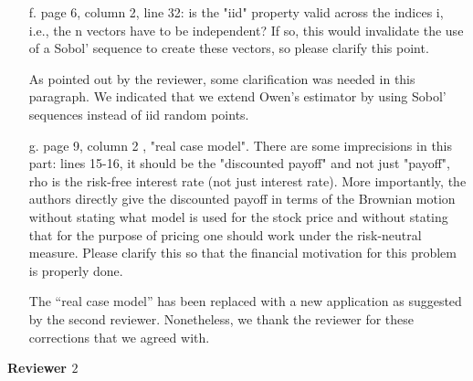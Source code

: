\documentclass[10pt,a4paper]{article}
\newcommand{\answer}[1]{{\color{blue} #1 }}
\begin{document}
\begin{itemize}
\item[f.] page 6, column 2, line 32: is the "iid" property valid across the indices i, i.e., the n vectors have to be independent? If so, this would invalidate the use of a Sobol' sequence to create these vectors, so please clarify this point.

\answer{As pointed out by the reviewer, some clarification was needed in this paragraph. We indicated that we extend  Owen's estimator by using Sobol' sequences instead of iid random points.}

\item[g.] page 9, column 2 , "real case model". There are some imprecisions in this part: lines 15-16, it should be the "discounted payoff" and not just "payoff", rho is the risk-free interest rate (not just interest rate). More importantly, the authors directly give the discounted payoff in terms of the Brownian motion without stating what model is used for the stock price and without stating that for the purpose of pricing one should work under the risk-neutral measure. Please clarify this so that the financial motivation for this problem is properly done.

{\color{blue} The ``real case model'' has been replaced with a new application as suggested by the second reviewer. Nonetheless, we thank the reviewer for these corrections that we agreed with.} 
\end{itemize}

\newpage
\textbf{\large{Reviewer $2$}}
\vspace*{0.5cm}
\end{document}
